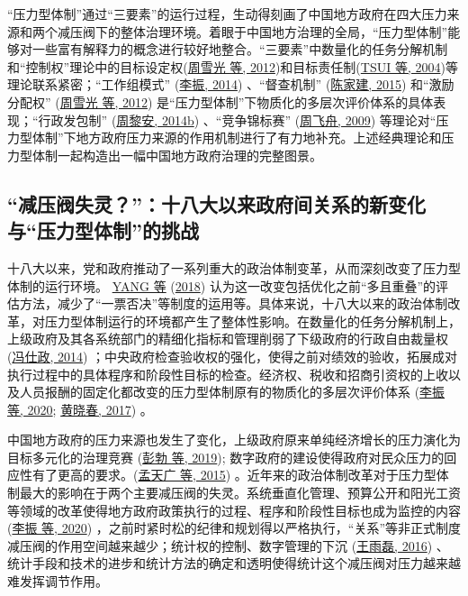 \documentclass[
  12pt,
]{ctexart}
\begin{document}
``压力型体制''通过``三要素''的运行过程，生动得刻画了中国地方政府在四大压力来源和两个减压阀下的整体治理环境。着眼于中国地方治理的全局，``压力型体制''能够对一些富有解释力的概念进行较好地整合。``三要素''中数量化的任务分解机制和``控制权''理论中的目标设定权(\protect\hyperlink{ref-ZhouXueGuangLianHong2012}{周雪光 等, 2012})和目标责任制(\protect\hyperlink{ref-TsuiWang2004}{TSUI 等, 2004})等理论联系紧密；``工作组模式'' (\protect\hyperlink{ref-LiZhen2014}{李振, 2014}) 、``督查机制'' (\protect\hyperlink{ref-ChenJiaJian2015}{陈家建, 2015}) 和``激励分配权'' (\protect\hyperlink{ref-ZhouXueGuangLianHong2012}{周雪光 等, 2012}) 是``压力型体制''下物质化的多层次评价体系的具体表现；``行政发包制'' (\protect\hyperlink{ref-ZhouLiAn2014a}{周黎安, 2014b}) 、``竞争锦标赛'' (\protect\hyperlink{ref-ZhouFeiZhou2009}{周飞舟, 2009}) 等理论对``压力型体制''下地方政府压力来源的作用机制进行了有力地补充。上述经典理论和压力型体制一起构造出一幅中国地方政府治理的完整图景。

\hypertarget{ux51cfux538bux9600ux5931ux7075ux5341ux516bux5927ux4ee5ux6765ux653fux5e9cux95f4ux5173ux7cfbux7684ux65b0ux53d8ux5316ux4e0eux538bux529bux578bux4f53ux5236ux7684ux6311ux6218}{%
\subsection{``减压阀失灵？''：十八大以来政府间关系的新变化与``压力型体制''的挑战}\label{ux51cfux538bux9600ux5931ux7075ux5341ux516bux5927ux4ee5ux6765ux653fux5e9cux95f4ux5173ux7cfbux7684ux65b0ux53d8ux5316ux4e0eux538bux529bux578bux4f53ux5236ux7684ux6311ux6218}}

十八大以来，党和政府推动了一系列重大的政治体制变革，从而深刻改变了压力型体制的运行环境。 \protect\hyperlink{ref-YangYan2018}{YANG 等} (\protect\hyperlink{ref-YangYan2018}{2018}) 认为这一改变包括优化之前``多且重叠''的评估方法，减少了``一票否决''等制度的运用等。具体来说，十八大以来的政治体制改革，对压力型体制运行的环境都产生了整体性影响。在数量化的任务分解机制上，上级政府及其各系统部门的精细化指标和管理削弱了下级政府的行政自由裁量权 (\protect\hyperlink{ref-FengShiZheng2014}{冯仕政, 2014}) ；中央政府检查验收权的强化，使得之前对绩效的验收，拓展成对执行过程中的具体程序和阶段性目标的检查。经济权、税收和招商引资权的上收以及人员报酬的固定化都改变的压力型体制原有的物质化的多层次评价体系 (\protect\hyperlink{ref-LiZhenEtAl2020}{李振 等, 2020}; \protect\hyperlink{ref-HuangXiaoChun2017}{黄晓春, 2017}) 。

中国地方政府的压力来源也发生了变化，上级政府原来单纯经济增长的压力演化为目标多元化的治理竞赛 (\protect\hyperlink{ref-PengBoZhaoJi2019}{彭勃 等, 2019}); 数字政府的建设使得政府对民众压力的回应性有了更高的要求。(\protect\hyperlink{ref-MengTianGuangLiFeng2015}{孟天广 等, 2015}) 。近年来的政治体制改革对于压力型体制最大的影响在于两个主要减压阀的失灵。系统垂直化管理、预算公开和阳光工资等领域的改革使得地方政府政策执行的过程、程序和阶段性目标也成为监控的内容 (\protect\hyperlink{ref-LiZhenEtAl2020}{李振 等, 2020}) ，之前时紧时松的纪律和规划得以严格执行，``关系''等非正式制度减压阀的作用空间越来越少；统计权的控制、数字管理的下沉 (\protect\hyperlink{ref-WangYuLei2016}{王雨磊, 2016}) 、统计手段和技术的进步和统计方法的确定和透明使得统计这个减压阀对压力越来越难发挥调节作用。
\end{document}
